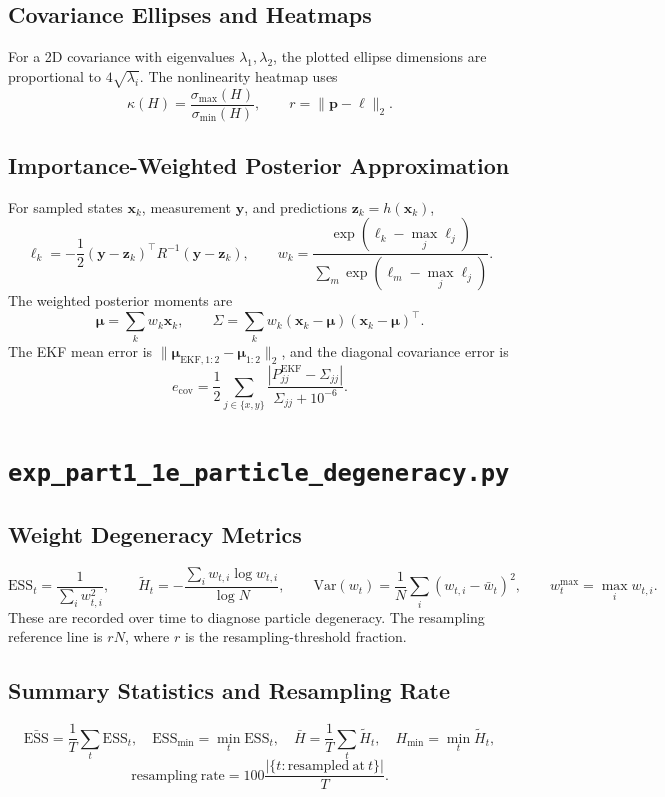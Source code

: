 \documentclass[11pt]{article}
\newcommand{\code}[1]{\texttt{#1}}
\newcommand{\Var}{\mathrm{Var}}
\newcommand{\ESS}{\mathrm{ESS}}
\begin{document}
\subsection*{Covariance Ellipses and Heatmaps}
For a 2D covariance with eigenvalues \(\lambda_1,\lambda_2\), the plotted ellipse dimensions are proportional to \(4\sqrt{\lambda_i}\). The nonlinearity heatmap uses
\[
\kappa(H)=\frac{\sigma_{\max}(H)}{\sigma_{\min}(H)},\qquad
r=\|\bm{p}-\bm{\ell}\|_2.
\]

\subsection*{Importance-Weighted Posterior Approximation}
For sampled states \(\bm{x}_k\), measurement \(\bm{y}\), and predictions \(\bm{z}_k=h(\bm{x}_k)\),
\[
\ell_k=-\frac12(\bm{y}-\bm{z}_k)^\top R^{-1}(\bm{y}-\bm{z}_k),\qquad
w_k=\frac{\exp(\ell_k-\max_j\ell_j)}{\sum_m\exp(\ell_m-\max_j\ell_j)}.
\]
The weighted posterior moments are
\[
\bm{\mu}=\sum_k w_k\bm{x}_k,\qquad
\Sigma=\sum_k w_k(\bm{x}_k-\bm{\mu})(\bm{x}_k-\bm{\mu})^\top.
\]
The EKF mean error is \(\|\bm{\mu}_{\mathrm{EKF},1:2}-\bm{\mu}_{1:2}\|_2\), and the diagonal covariance error is
\[
e_{\mathrm{cov}}=\frac12\sum_{j\in\{x,y\}}
\frac{|P^{\mathrm{EKF}}_{jj}-\Sigma_{jj}|}{\Sigma_{jj}+10^{-6}}.
\]

\section{\code{exp\_part1\_1e\_particle\_degeneracy.py}}
\subsection*{Weight Degeneracy Metrics}
\[
\ESS_t=\frac{1}{\sum_iw_{t,i}^2},\qquad
\tilde H_t=-\frac{\sum_iw_{t,i}\log w_{t,i}}{\log N},\qquad
\Var(w_t)=\frac{1}{N}\sum_i(w_{t,i}-\bar w_t)^2,\qquad
w^{\max}_t=\max_iw_{t,i}.
\]
These are recorded over time to diagnose particle degeneracy. The resampling reference line is \(rN\), where \(r\) is the resampling-threshold fraction.

\subsection*{Summary Statistics and Resampling Rate}
\[
\bar{\ESS}=\frac{1}{T}\sum_t\ESS_t,\quad
\ESS_{\min}=\min_t\ESS_t,\quad
\bar H=\frac{1}{T}\sum_t\tilde H_t,\quad
H_{\min}=\min_t\tilde H_t,
\]
\[
\mathrm{resampling\ rate}=100\frac{|\{t:\mathrm{resampled\ at\ }t\}|}{T}.
\]
\end{document}
